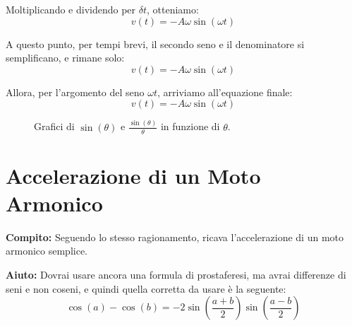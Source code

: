 \documentclass{article}
\begin{document}
Moltiplicando e dividendo per $\delta t$, otteniamo:
\begin{equation}
    v(t) = -A \omega \sin(\omega t)
\end{equation}

A questo punto, per tempi brevi, il secondo seno e il denominatore si semplificano, e rimane solo:
\begin{equation}
    v(t) = -A \omega \sin(\omega t)
\end{equation}

Allora, per l'argomento del seno $\omega t$, arriviamo all'equazione finale:
\begin{equation}
    v(t) = -A \omega \sin(\omega t)
\end{equation}

\begin{figure}[h!]
    \centering
    \caption{Grafici di $\sin(\theta)$ e $\frac{\sin(\theta)}{\theta}$ in funzione di $\theta$.}
    \label{fig:sin_div_theta}
\end{figure}

\section*{Accelerazione di un Moto Armonico}

\textbf{Compito:} Seguendo lo stesso ragionamento, ricava l'accelerazione di un moto armonico semplice.

\textbf{Aiuto:} Dovrai usare ancora una formula di prostaferesi, ma avrai differenze di seni e non coseni, e quindi quella corretta da usare \`e la seguente:
\begin{equation}
    \cos(a) - \cos(b) = -2 \sin\left(\frac{a + b}{2}\right) \sin\left(\frac{a - b}{2}\right)
\end{equation}
\end{document}
